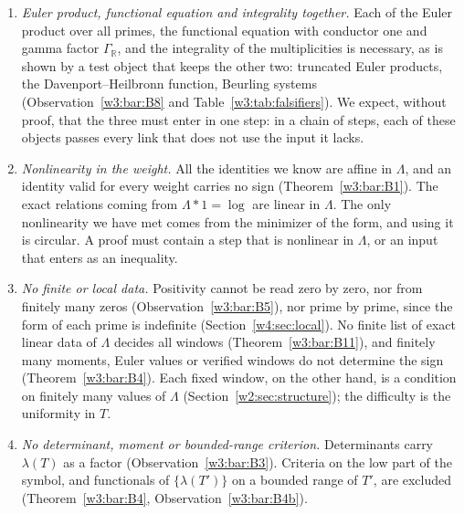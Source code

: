 \documentclass[11pt]{amsart}
\theoremstyle{definition}
\theoremstyle{remark}
\numberwithin{equation}{section}
\newcommand{\R}{\mathbb{R}}
\newcommand{\PT}{\mathcal{P}_T}                        %
\newcommand{\mT}{\mathfrak{m}_T}                       %
\newcommand{\lam}{\lambda(T)}                          %
\newcommand{\Tarch}{T^{*}_{\infty,\mathrm P}}          %
\begin{document}
\begin{enumerate}[label=(\arabic*),leftmargin=*]
{fluctuation.} The archimedean form has at least $(2t_0/\pi)T-3\approx4T-3$ negative directions on $\PT$
(Theorem~\ref{w2:thm:archcount}), and beyond the threshold $\Tarch$ the primes must compensate them
(Remark~\ref{w2:obs:arch}). By Proposition~\ref{w8:prop:kappa} they cannot do so through their density: the
negative part of $\mT+\mathfrak e_T$ has to be paid by the fluctuation form $\Phi_T$. The two parts cannot be
bounded separately.
\item\label{w8:con:inputs} \emph{Euler product, functional equation and integrality together.} Each of the Euler
product over all primes, the functional equation with conductor one and gamma factor $\Gamma_\R$, and the
integrality of the multiplicities is necessary, as is shown by a test object that keeps the other two: truncated
Euler products, the Davenport--Heilbronn function, Beurling systems (Observation~\ref{w3:bar:B8} and
Table~\ref{w3:tab:falsifiers}). We expect, without proof, that the three must enter in one step: in a chain of
steps, each of these objects passes every link that does not use the input it lacks.
\item\label{w8:con:nonlin} \emph{Nonlinearity in the weight.} All the identities we know are affine in $\Lambda$,
and an identity valid for every weight carries no sign (Theorem~\ref{w3:bar:B1}). The exact relations coming from
$\Lambda*1=\log$ are linear in $\Lambda$. The only nonlinearity we have met comes from the minimizer of the form,
and using it is circular. A proof must contain a step that is nonlinear in $\Lambda$, or an input that enters as
an inequality.
\item\label{w8:con:nonlocal}\label{w8:con:finite} \emph{No finite or local data.} Positivity cannot be read zero
by zero, nor from finitely many zeros (Observation~\ref{w3:bar:B5}), nor prime by prime, since the form of each prime is
indefinite (Section~\ref{w4:sec:local}). No finite list of exact linear data of $\Lambda$ decides all windows
(Theorem~\ref{w3:bar:B11}), and finitely many moments, Euler values or verified windows do not determine the sign
(Theorem~\ref{w3:bar:B4}). Each fixed window, on the other hand, is a condition on finitely many values of
$\Lambda$ (Section~\ref{w2:sec:structure}); the difficulty is the uniformity in $T$.
\item\label{w8:con:criteria} \emph{No determinant, moment or bounded-range criterion.} Determinants carry
$\lam$ as a factor (Observation~\ref{w3:bar:B3}). Criteria on the low part of the symbol, and functionals of
$\{\lambda(T')\}$ on a bounded range of $T'$, are excluded (Theorem~\ref{w3:bar:B4}, Observation~\ref{w3:bar:B4b}).

\end{enumerate}
\end{document}
